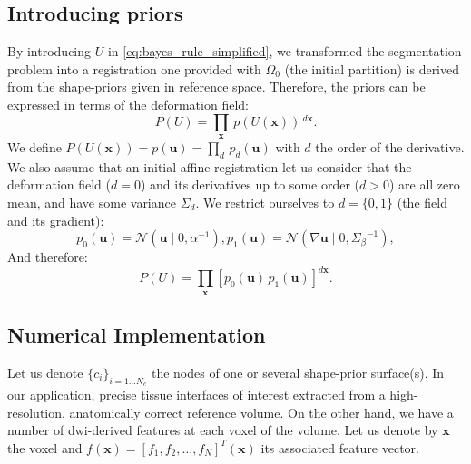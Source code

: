 \subsection{Introducing priors}
\label{sec:priors}
%
By introducing $U$ in \eqref{eq:bayes_rule_simplified}, we transformed 
the segmentation problem into a registration one provided with $\Omega_0$ 
(the initial partition) is derived from the shape-priors given in reference 
space. Therefore, the priors can be expressed in terms of the deformation
field:
\begin{equation}
P(U) = \underset{\mathbf{x}}{\prod}\,p(U(\mathbf{x}))\,^{d\mathbf{x}}.
\label{eq:prior_u}
\end{equation}
We define $P(U(\mathbf{x})) = p(\mathbf{u}) = \underset{d}\prod \, p_d(\mathbf{u})$ 
with $d$ the order of the derivative. We also assume that an initial
affine registration let us consider that the deformation field ($d=0$)
and its derivatives up to some order ($d>0$) are all zero mean, and
have some variance $\Sigma_d$. We restrict ourselves to $d=\lbrace 0,1 \rbrace$
(the field and its gradient):
\begin{subequations}
\begin{equation}
p_0(\mathbf{u}) = \mathcal{N}( \mathbf{u} \mid 0, \alpha^{-1}),
\end{equation}
\begin{equation}
p_1(\mathbf{u}) = \mathcal{N}( \nabla \mathbf{u} \mid 0, {\Sigma_\beta}^{-1}), 
\end{equation}
\end{subequations}
And therefore:
\begin{equation}
P(U) = \underset{\mathbf{x}}\prod \left[ p_0(\mathbf{u}) \, p_1(\mathbf{u}) \right]^{d\mathbf{x}}.
\end{equation}




\subsection{Numerical Implementation}
%
Let us denote $\{c_i\}_{i=1 \ldots N_c}$ the nodes of one or several shape-prior
surface(s). In our application, precise tissue interfaces of interest 
extracted from a high-resolution, anatomically correct reference volume. 
On the other hand, we have a number of \gls{dwi}-derived features at each
voxel of the volume. Let us denote by $\mathbf{x}$ the voxel and $f(\mathbf{x}) = 
[ f_1, f_2, \ldots, f_N]^T(\mathbf{x})$ its associated feature vector.

